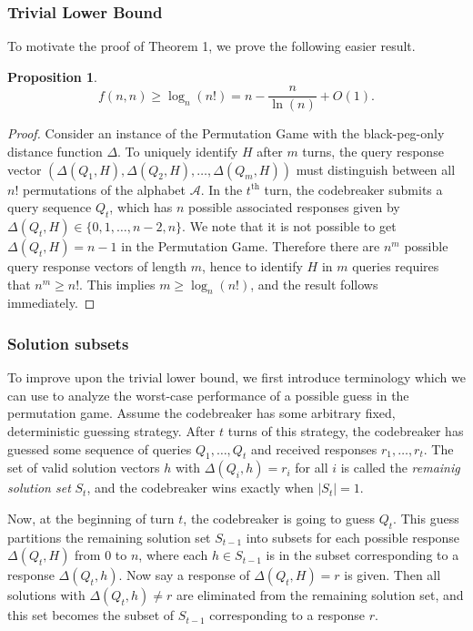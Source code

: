 \documentclass[12pt, a4paper]{article}
\newcommand{\nth}{^{\text{th}}}       %
\newtheorem{proposition}{Proposition}
\begin{document}
	\subsubsection{Trivial Lower Bound}
	To motivate the proof of Theorem 1, we prove the following easier result.
	\begin{proposition}
		\begin{equation*}
			f(n, n)\ge \log_{n}(n!) = n-\frac{n}{\ln(n)}+O(1).		
		\end{equation*}
	\end{proposition}
	\begin{proof}
		Consider an instance of the Permutation Game with the black-peg-only distance function $\Delta$. To uniquely identify $H$ after $m$ turns, the query response vector $(\Delta(Q_1, H), \Delta(Q_2, H), \ldots, \Delta(Q_m, H))$ must distinguish between all $n!$ permutations of the alphabet $\mathcal{A}$. In the $t\nth$ turn, the codebreaker submits a query sequence $Q_t$, which has $n$ possible associated responses given by $\Delta(Q_t, H)\in\{0, 1, \ldots, n-2, n\}$. We note that it is not possible to get $\Delta(Q_t, H)=n-1$ in the Permutation Game. Therefore there are $n^m$ possible query response vectors of length $m$, hence to identify $H$ in $m$ queries requires that $n^m\ge n!$. This implies $m\ge\log_n(n!)$, and the result follows immediately.
	\end{proof}

	\subsubsection{Solution subsets}
	To improve upon the trivial lower bound, we first introduce terminology which we can use to analyze the worst-case performance of a possible guess in the permutation game. Assume the codebreaker has some arbitrary fixed, deterministic guessing strategy. After $t$ turns of this strategy, the codebreaker has guessed some sequence of queries $Q_1, \dots, Q_t$ and received responses $r_1,\dots,r_t$. The set of valid solution vectors $h$ with $\Delta(Q_i,h) = r_i$ for all $i$ is called the \textit{remainig solution set} $S_t$, and the codebreaker wins exactly when $|S_t| = 1$.
	
	Now, at the beginning of turn $t$, the codebreaker is going to guess $Q_t$. This guess partitions the remaining solution set $S_{t-1}$ into subsets for each possible response $\Delta(Q_t,H)$ from 0 to $n$, where each $h \in S_{t-1}$ is in the subset corresponding to a response $\Delta(Q_t,h)$. Now say a response of $\Delta(Q_t,H) = r$ is given. Then all solutions with $\Delta(Q_t,h) \neq r$ are eliminated from the remaining solution set, and this set becomes the subset of $S_{t-1}$ corresponding to a response $r$.
	
\end{document}
